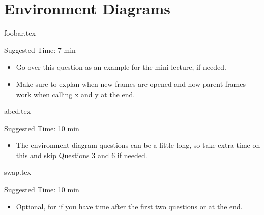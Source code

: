\documentclass{exam}
\begin{document}
\section{Environment Diagrams}
\begin{questions}


    {foobar.tex}
    \begin{questionmeta}
        Suggested Time: 7 min
        \begin{itemize}
            \item Go over this question as an example for the mini-lecture, if needed.
            \item Make sure to explan when new frames are opened and how parent frames work when calling x and y at the end.
        \end{itemize}
    \end{questionmeta}

    {abcd.tex}
    \begin{questionmeta}
        Suggested Time: 10 min
        \begin{itemize}
            \item The environment diagram questions can be a little long, so take extra time on this and skip Questions 3 and 6 if needed.
        \end{itemize}
    \end{questionmeta}



{swap.tex}
    \begin{questionmeta}
        Suggested Time: 10 min
        \begin{itemize}
            \item Optional, for if you have time after the first two questions or at the end.
        \end{itemize}
    \end{questionmeta}
\end{questions}
\end{document}
